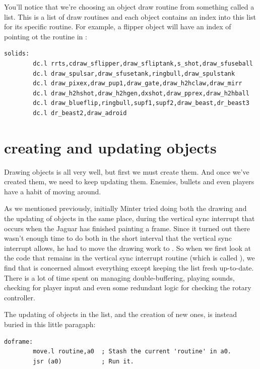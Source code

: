 You'll notice that we're choosing an object draw routine from something
called a  list. This is a list of draw routines and each
object contains an index into this list for its specific routine. For example,
a flipper object will have an index of  pointing ot the 
routine in :

\begin{lstlisting}
solids: 
        dc.l rrts,cdraw_sflipper,draw_sfliptank,s_shot,draw_sfuseball
        dc.l draw_spulsar,draw_sfusetank,ringbull,draw_spulstank
        dc.l draw_pixex,draw_pup1,draw_gate,draw_h2hclaw,draw_mirr
        dc.l draw_h2hshot,draw_h2hgen,dxshot,draw_pprex,draw_h2hball
        dc.l draw_blueflip,ringbull,supf1,supf2,draw_beast,dr_beast3
        dc.l dr_beast2,draw_adroid            
\end{lstlisting}

\label{sec:updating}
\section*{creating and updating objects}
Drawing objects is all very well, but first we must create them. And once we've
created them, we need to keep updating them. Enemies, bullets and even players
have a habit of moving around. 

As we mentioned previously, initially Minter tried doing both the drawing and the
updating of objects in the same place, during the vertical sync interrupt that
occurs when the Jaguar has finished painting a frame. Since it turned out there
wasn't enough time to do both in the short interval that the vertical sync interrupt
allows, he had to move the drawing work to . So when we first look at
the code that remains in the vertical sync interrupt routine (which is called
), we find that is concerned almost everything except keeping 
the  list fresh up-to-date. There is a lot of time spent
on managing double-buffering, playing sounds, checking for player input and even some
redundant logic for checking the rotary controller.

The updating of objects in the  list, and the creation of new ones,
is instead buried in this little paragaph:
\begin{lstlisting}
doframe:
        move.l routine,a0  ; Stash the current 'routine' in a0.
        jsr (a0)           ; Run it.
\end{lstlisting}

